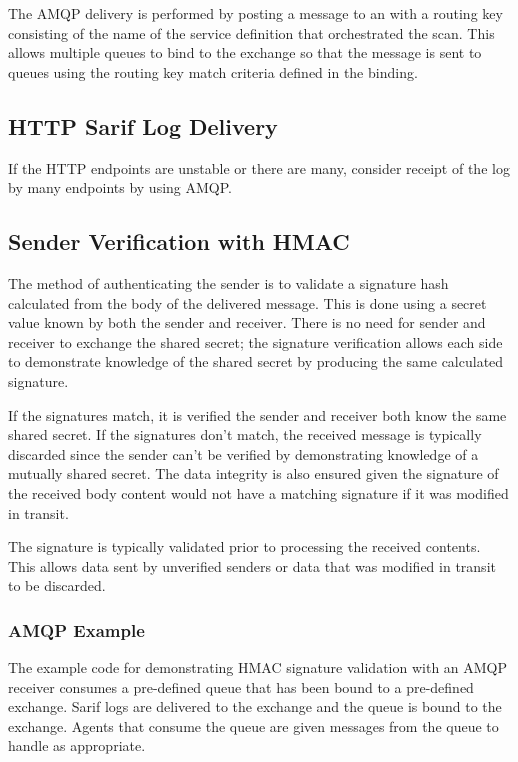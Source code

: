 The AMQP delivery is performed by posting a message to an  with a routing key
consisting of the name of the service definition that orchestrated the scan.  This allows multiple queues to bind to the exchange
so that the message is sent to queues using the routing key match criteria defined in the binding.


\subsection{HTTP Sarif Log Delivery}\label{sec:push-sarif-http}
If the HTTP endpoints are unstable or there are many, consider receipt of the log
by many endpoints by using AMQP.



\subsection{Sender Verification with HMAC}
The method of authenticating the sender is to validate a signature hash calculated
from the body of the delivered message.  This is done using a secret value
known by both the sender and receiver.  There is no need for sender and receiver to
exchange the shared secret; the signature verification allows each side to demonstrate
knowledge of the shared secret by producing the same calculated signature.

If the signatures match, it is verified the sender and receiver both know the same
shared secret.  If the signatures don't match, the received message is typically
discarded since the sender can't be verified by demonstrating knowledge of a
mutually shared secret.  The data integrity is also ensured given the signature
of the received body content would not have a matching signature if it was
modified in transit.

The signature is typically validated prior to processing the received contents.  This
allows data sent by unverified senders or data that was modified in transit to be
discarded.

\subsubsection{AMQP Example}

The example code for demonstrating HMAC signature validation with an AMQP receiver
consumes a pre-defined queue that has been bound to a pre-defined exchange. Sarif logs are
delivered to the exchange and the queue is bound to the exchange.  Agents that consume
the queue are given messages from the queue to handle as appropriate.

